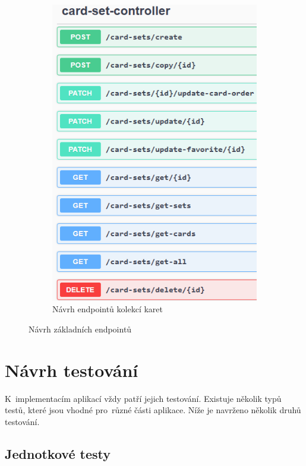 \documentclass[twoside]{ctuthesis}
\begin{document}
\begin{figure}[H]
\begin{subfigure}[t]{0.49\textwidth}
  \includegraphics[width=1.1\linewidth, height=0.6\textheight]{sets.png}
  \caption{Návrh endpointů kolekcí karet}
  \label{fig:setsapi}
\end{subfigure}
\caption{Návrh základních endpointů}
\label{fig:apis}
\end{figure}

\newpage

\section{Návrh testování}
\label{sec:fiveseven}

K~implementacím aplikací vždy patří jejich testování. Existuje několik typů testů, které jsou vhodné pro~různé části aplikace. Níže je navrženo několik druhů testování.

\subsection{Jednotkové testy}
\end{document}
